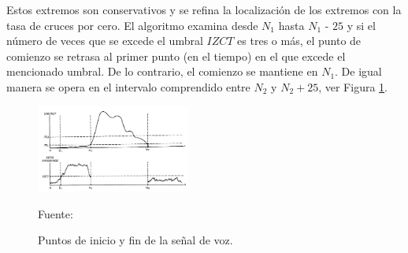 \begin{enumerate}
\begin{enumerate}
\newpage
Estos extremos son conservativos y se refina la localización de los extremos con la tasa de cruces por cero. El algoritmo examina desde $N_{1}$ hasta $N_{1}$ - $25$ y si el número de veces que se excede el umbral $IZCT$ es tres o más, el punto de comienzo se retrasa al primer punto (en el tiempo) en el que excede el mencionado umbral. De lo contrario, el comienzo se mantiene en $N_{1}$. De igual manera se opera en el intervalo comprendido entre $N_{2}$ y $N_{2} + 25$, ver Figura \ref{fig:figura2.29}.
\vskip 0.2cm
\begin{figure}[ht]
\begin{center}
\includegraphics[width=0.45\textwidth]{Imagenes/Cap2/image030}
\end{center}
\begin{center}
\vskip -0.5cm
\caption{\small{Puntos de inicio y fin de la señal de voz.}}
\label{fig:figura2.29}
{\small{Fuente: \cite{rabiner}}}
\end{center}
\end{figure}
\end{enumerate}


\end{enumerate}
